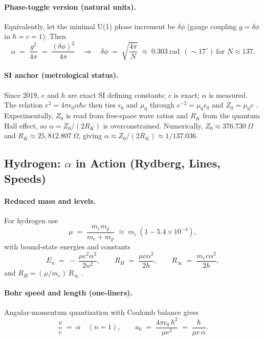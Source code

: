 \documentclass[11pt,oneside]{article}
\begin{document}
\paragraph{Phase-toggle version (natural units).}
Equivalently, let the minimal U(1) phase increment be $\delta\phi$ (gauge coupling $g=\delta\phi$ in $\hbar=c=1$). Then
\begin{equation}
\alpha \;=\; \frac{g^2}{4\pi} \;=\; \frac{(\delta\phi)^2}{4\pi}
\quad\Rightarrow\quad
\delta\phi \;=\; \sqrt{\frac{4\pi}{N}} \;\approx\; 0.303~\text{rad}\ \ (\sim 17^\circ)\ \text{for } N\!\approx\!137.
\end{equation}

\paragraph{SI anchor (metrological status).}
Since 2019, $e$ and $h$ are exact SI defining constants; $c$ is exact; $\alpha$ is measured. The relation $e^2=4\pi\epsilon_0\alpha\hbar c$ then ties $\epsilon_0$ and $\mu_0$ through $c^{-2}=\mu_0\epsilon_0$ and $Z_0=\mu_0 c$ \cite{bipm2019si,tiesinga2021codata}. Experimentally, $Z_0$ is read from free-space wave ratios and $R_K$ from the quantum Hall effect, so $\alpha=Z_0/(2R_K)$ is overconstrained. Numerically, $Z_0 \approx 376.730~\Omega$ and $R_K \approx 25{,}812.807~\Omega$, giving $\alpha \approx Z_0/(2R_K)\approx 1/137.036$.

\subsection{Hydrogen: \texorpdfstring{$\alpha$}{alpha} in Action (Rydberg, Lines, Speeds)}

\paragraph{Reduced mass and levels.}
For hydrogen use
\begin{equation}
\mu \;=\; \frac{m_e m_p}{m_e+m_p} \;\approx\; m_e\,(1-5.4\times 10^{-4}),
\end{equation}
with bound-state energies and constants
\begin{equation}
E_n \;=\; -\,\frac{\mu c^2 \alpha^2}{2 n^2},\qquad
R_H \;=\; \frac{\mu c \alpha^2}{2h},\qquad
R_\infty \;=\; \frac{m_e c \alpha^2}{2h},
\end{equation}
and $R_H=(\mu/m_e)\,R_\infty$ \cite{griffiths2018quantum}.

\paragraph{Bohr speed and length (one-liners).}
Angular-momentum quantization with Coulomb balance gives
\begin{equation}
\frac{v}{c} \;=\; \alpha \quad (n=1), \qquad
a_0 \;=\; \frac{4\pi\epsilon_0\,\hbar^2}{\mu e^2} \;=\; \frac{\hbar}{\mu c\,\alpha}.
\end{equation}
\end{document}
